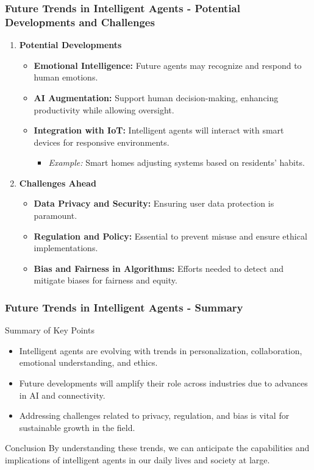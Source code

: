 \documentclass[aspectratio=169]{beamer}
\begin{document}
\begin{frame}[fragile]
    \frametitle{Future Trends in Intelligent Agents - Potential Developments and Challenges}
    \begin{enumerate}
        \item \textbf{Potential Developments}
        \begin{itemize}
            \item \textbf{Emotional Intelligence:} Future agents may recognize and respond to human emotions.
            \item \textbf{AI Augmentation:} Support human decision-making, enhancing productivity while allowing oversight.
            \item \textbf{Integration with IoT:} Intelligent agents will interact with smart devices for responsive environments.
            \begin{itemize}
                \item \textit{Example:} Smart homes adjusting systems based on residents' habits.
            \end{itemize}
        \end{itemize}

        \item \textbf{Challenges Ahead}
        \begin{itemize}
            \item \textbf{Data Privacy and Security:} Ensuring user data protection is paramount.
            \item \textbf{Regulation and Policy:} Essential to prevent misuse and ensure ethical implementations.
            \item \textbf{Bias and Fairness in Algorithms:} Efforts needed to detect and mitigate biases for fairness and equity.
        \end{itemize}
    \end{enumerate}
\end{frame}

\begin{frame}[fragile]
    \frametitle{Future Trends in Intelligent Agents - Summary}
    \begin{block}{Summary of Key Points}
        \begin{itemize}
            \item Intelligent agents are evolving with trends in personalization, collaboration, emotional understanding, and ethics.
            \item Future developments will amplify their role across industries due to advances in AI and connectivity.
            \item Addressing challenges related to privacy, regulation, and bias is vital for sustainable growth in the field.
        \end{itemize}
    \end{block}
    \begin{block}{Conclusion}
        By understanding these trends, we can anticipate the capabilities and implications of intelligent agents in our daily lives and society at large.
    \end{block}
\end{frame}
\end{document}
